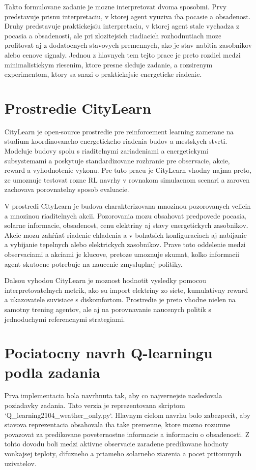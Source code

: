 \documentclass[conference]{IEEEtran}
\begin{document}
Takto formulovane zadanie je mozne interpretovat dvoma sposobmi. Prvy predstavuje prisnu interpretaciu, v ktorej agent vyuziva iba pocasie a obsadenost. Druhy predstavuje praktickejsiu interpretaciu, v ktorej agent stale vychadza z pocasia a obsadenosti, ale pri zlozitejsich riadiacich rozhodnutiach moze profitovat aj z dodatocnych stavovych premennych, ako je stav nabitia zasobnikov alebo cenove signaly. Jednou z hlavnych tem tejto prace je preto rozdiel medzi minimalistickym riesenim, ktore presne sleduje zadanie, a rozsirenym experimentom, ktory sa snazi o praktickejsie energeticke riadenie.

\section{Prostredie CityLearn}
CityLearn je open-source prostredie pre reinforcement learning zamerane na studium koordinovaneho energetickeho riadenia budov a mestskych stvrti. Modeluje budovy spolu s riaditelnymi zariadeniami a energetickymi subsystemami a poskytuje standardizovane rozhranie pre observacie, akcie, reward a vyhodnotenie vykonu. Pre tuto pracu je CityLearn vhodny najma preto, ze umoznuje testovat rozne RL navrhy v rovnakom simulacnom scenari a zaroven zachovava porovnatelny sposob evaluacie.

V prostredi CityLearn je budova charakterizovana mnozinou pozorovanych velicin a mnozinou riaditelnych akcii. Pozorovania mozu obsahovat predpovede pocasia, solarne informacie, obsadenost, cenu elektriny aj stavy energetickych zasobnikov. Akcie mozu zahŕňať riadenie chladenia a v bohatsich konfiguraciach aj nabijanie a vybijanie tepelnych alebo elektrickych zasobnikov. Prave toto oddelenie medzi observaciami a akciami je klucove, pretoze umoznuje skumat, kolko informacii agent skutocne potrebuje na naucenie zmysluplnej politiky.

Dalsou vyhodou CityLearn je moznost hodnotit vysledky pomocou interpretovatelnych metrik, ako su import elektriny zo siete, kumulativny reward a ukazovatele suvisiace s diskomfortom. Prostredie je preto vhodne nielen na samotny trening agentov, ale aj na porovnavanie naucenych politik s jednoduchymi referencnymi strategiami.

\section{Pociatocny navrh Q-learningu podla zadania}
Prva implementacia bola navrhnuta tak, aby co najvernejsie nasledovala poziadavky zadania. Tato verzia je reprezentovana skriptom `Q_learning2104_weather_only.py`. Hlavnym cielom navrhu bolo zabezpecit, aby stavova reprezentacia obsahovala iba take premenne, ktore mozno rozumne povazovat za predikovane poveternostne informacie a informaciu o obsadenosti. Z tohto dovodu boli medzi aktivne observacie zaradene predikovane hodnoty vonkajsej teploty, difuzneho a priameho solarneho ziarenia a pocet pritomnych uzivatelov.
\end{document}
